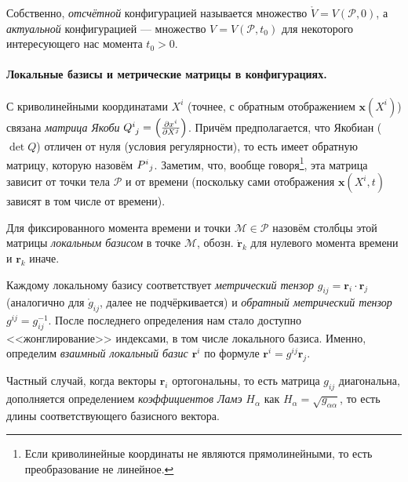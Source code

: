 Собственно, \emph{отсчётной} конфигурацией называется множество $ \mathring V =
V(\mathcal P,
0)$, а \emph{актуальной} конфигурацией --- множество $ V = V(\mathcal P, t_0) $ для
некоторого интересующего нас момента $ t_0 > 0 $.

\paragraph{Локальные базисы и метрические матрицы в конфигурациях.} С
криволинейными координатами $ X^i $ (точнее, с обратным отображением $ \mathbf
x(X^i) $) связана \emph{матрица Якоби} $
\tensor{Q}{^i_j} = \left( \frac{\partial x^i}{\partial X^j}\right)  $. Причём
предполагается, что Якобиан ($ \det Q $) отличен от нуля (условия регулярности),
то есть имеет обратную матрицу, которую назовём $ \tensor{P}{^i}{_j} $.
Заметим, что, вообще говоря\footnote{Если криволинейные координаты не являются
прямолинейными, то есть преобразование не линейное.}, эта матрица зависит от точки тела $ \mathcal
P$ и от времени (поскольку сами отображения $ \mathbf{x}(X^i, t) $ зависят в том
числе от времени).

Для фиксированного момента времени и точки $ \mathcal M \in \mathcal P $ назовём
столбцы этой матрицы \emph{локальным базисом} в точке $ \mathcal M $, обозн. $
\mathring{\mathbf{r}}_k $ для нулевого момента времени и $ \mathbf{r}_k $ иначе. 

Каждому локальному базису соответствует \emph{метрический тензор} $ g_{ij} =
\mathbf{r}_i \cdot \mathbf{r}_j $ (аналогично для $ \mathring g_{ij} $, далее не
подчёркивается) и
\emph{обратный метрический тензор} $ g^{ij} = g^{-1}_{ij} $. После последнего
определения нам стало доступно <<жонглирование>> индексами, в том числе
локального базиса. Именно, определим \emph{взаимный локальный базис $
\mathbf{r}^i $} по формуле $ \mathbf{r}^i = g^{ij}\mathbf{r}_j $.

Частный случай, когда векторы $ \mathbf{r}_i $ ортогональны, то есть матрица $
g_{ij} $ диагональна, дополняется определением \emph{коэффициентов Ламэ} $
H_\alpha $ как $ H_\alpha = \sqrt{g_{\alpha\alpha}} $, то есть длины
соответствующего базисного вектора.
